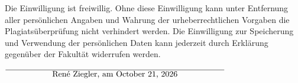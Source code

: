 \documentclass[12pt,oneside,a4paper,parskip]{scrbook}
\def\BaAuthor{René Ziegler}
\begin{document}
\begin{small}
Die Einwilligung ist freiwillig. Ohne diese Einwilligung kann unter Entfernung aller persönlichen Angaben und Wahrung der urheberrechtlichen Vorgaben die Plagiatsüberprüfung nicht verhindert werden. Die Einwilligung zur Speicherung und Verwendung der persönlichen Daten kann jederzeit durch Erklärung gegenüber der Fakultät widerrufen werden.
\end{small}

\vspace{20pt}
\begin{flushright}
$\overline{~~~~~~~~~~~~~~~~~\mbox{\BaAuthor, am \today}~~~~~~~~~~~~~~~~~}$
\end{flushright}
\end{document}
